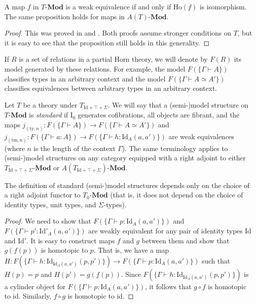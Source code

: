 \documentclass[reqno]{amsart}
\theoremstyle{definition}
\theoremstyle{remark}
\newcommand{\fs}[1]{\mathrm{#1}}
\newcommand{\bcat}[1]{\mathbf{#1}}
\newcommand{\Mod}[1]{#1\text{-}\bcat{Mod}}
\newcommand{\I}{\fs{I}}
\numberwithin{figure}{section}
\begin{document}
\begin{prop}
A map $f$ in $\Mod{T}$ is a weak equivalence if and only if $\fs{Ho}(f)$ is isomorphism.
The same proposition holds for maps in $\Mod{A(T)}$.
\end{prop}
\begin{proof}
This was proved in \cite[Proposition~3.11]{alg-models} and \cite[Proposition~3.3]{kap-lum-model}.
Both proofs assume stronger conditions on $T$, but it is easy to see that the proposition still holds in this generality.
\end{proof}

If $R$ is a set of relations in a partial Horn theory, we will denote by $F(R)$ its model generated by these relations.
For example, the model $F(\{ \Gamma \vdash A \})$ classifies types in an arbitrary context and the model $F(\{ \Gamma \vdash A \simeq A' \})$ classifies equivalences between arbitrary types in an arbitrary context.

\begin{defn}
Let $T$ be a theory under $T_{\fs{Id} + \top + \Sigma}$.
We will say that a (semi-)model structure on $\Mod{T}$ is \emph{standard} if $\I_0$ generates cofibrations, all objects are fibrant,
and the maps $j_{(\fs{ty},n)} : F(\{ \Gamma \vdash A \}) \to F(\{ \Gamma \vdash A \simeq A' \})$ and $j_{(\fs{tm},n)} : F(\{ \Gamma \vdash a : A \}) \to F(\{ \Gamma \vdash h : \fs{Id}_A(a,a') \})$ are weak equivalences (where $n$ is the length of the context $\Gamma$).
The same terminology applies to (semi-)model structures on any category equipped with a right adjoint to either $\Mod{T_{\fs{Id} + \top + \Sigma}}$ or $\Mod{A(T_{\fs{Id} + \top + \Sigma})}$.
\end{defn}

\begin{prop}
The definition of standard (semi-)model structures depends only on the choice of a right adjoint functor to $\Mod{T_0}$ (that is, it does not depend on the choice of identity types, unit types, and $\Sigma$-types).
\end{prop}
\begin{proof}
We need to show that $F(\{ \Gamma \vdash p : \fs{Id}_A(a,a') \})$ and $F(\{ \Gamma \vdash p' : \fs{Id}'_A(a,a')\})$ are weakly equivalent for any pair of identity types $\fs{Id}$ and $\fs{Id}'$.
It is easy to construct maps $f$ and $g$ between them and show that $g(f(p))$ is homotopic to $p$.
That is, we have a map $H : F(\{ \Gamma \vdash h : \fs{Id}_{\fs{Id}_A(a,a')}(p,p') \}) \to F(\{ \Gamma \vdash p : \fs{Id}_A(a,a') \})$ such that $H(p) = p$ and $H(p') = g(f(p))$.
Since $F(\{ \Gamma \vdash h : \fs{Id}_{\fs{Id}_A(a,a')}(p,p') \})$ is a cylinder object for $F(\{ \Gamma \vdash p : \fs{Id}_A(a,a') \})$, it follows that $g \circ f$ is homotopic to $\fs{id}$.
Similarly, $f \circ g$ is homotopic to $\fs{id}$.
\end{proof}
\end{document}
